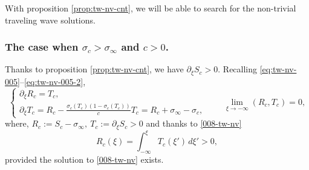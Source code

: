 \documentclass[12pt]{article}
\theoremstyle{definition}
\theoremstyle{remark}
\numberwithin{equation}{section}
\begin{document}
With proposition \ref{prop:tw-nv-cnt}, we will be able to search for the non-trivial traveling wave solutions.

\subsubsection{The case when $ \sigma_c > \sigma_\infty $ and $ c > 0 $.}
\label{subsubsec:++}
Thanks to proposition \ref{prop:tw-nv-cnt}, we have $ \partial_\xi S_c > 0 $. 
Recalling \eqref{eq:tw-nv-005}--\eqref{eq:tw-nv-005-2}, 
\begin{equation}
    \label{008-tw-nv}
    \begin{cases}
        \partial_\xi R_c = T_c, \\
        \partial_\xi T_c = R_c - \frac{\sigma_c(T_c) (1-\sigma_c(T_c))}{c} T_c = R_c + \sigma_\infty - \sigma_c,
    \end{cases} \qquad \lim_{\xi\rightarrow -\infty} (R_c, T_c) = 0,
\end{equation}
where, 
    $ R_c := S_c - \sigma_\infty, \ T_c := \partial_\xi S_c > 0 $ and thanks to \eqref{008-tw-nv}
    \begin{equation}
        \label{008-tw-nv-1}
        R_c(\xi) = \int_{-\infty}^\xi T_c(\xi') \, d\xi' > 0,
    \end{equation}
    provided the solution to \eqref{008-tw-nv} exists.
\end{document}
